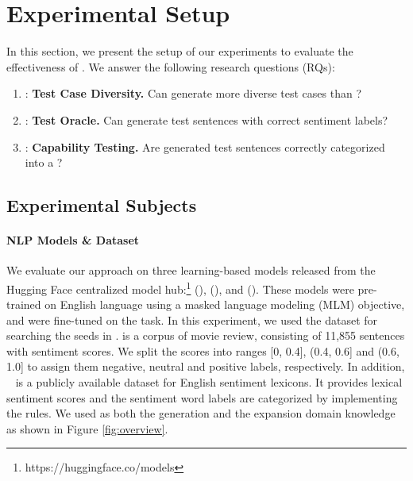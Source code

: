 \section{Experimental Setup}
\label{sec:experiment}
%
In this section, we present the setup of our experiments to evaluate
the effectiveness of \tool. We answer the following research
questions (RQs):

\begin{enumerate}[label=\textbf{RQ\arabic*}]
\item \label{rq:three}: \textbf{Test Case Diversity.} Can \tool generate more diverse test cases
  than \Cklst?
\item \label{rq:one}: \textbf{Test Oracle.}  Can \tool generate test sentences with correct sentiment labels?
\item \label{rq:two}: \textbf{Capability Testing.} Are \tool generated test sentences correctly categorized into a \lc?
\end{enumerate}


\subsection{Experimental Subjects}

\paragraph*{\textbf{NLP Models \& Dataset}}
We evaluate our approach on three learning-based \sa models released from the Hugging Face centralized
model hub:\footnote{https://huggingface.co/models} \texttt{\Bert}
(\bertsamodel), \texttt{\Roberta} (\robertasamodel), and \texttt{\Dbert} (\disbertsamodel). These models were pre-trained on English
language using a masked language modeling (MLM) objective, and
were fine-tuned on the \sa task. In this experiment, we used the \Sst \cite{socher2013sst} dataset for
searching the seeds in \tool. \Sst is a
corpus of movie review, consisting of 11,855 sentences
with sentiment scores. We split the
scores into ranges [0, 0.4], (0.4, 0.6] and (0.6, 1.0] to assign them
negative, neutral and positive labels, respectively. In addition,
\Swn~\cite{baccianella2010sentiwordnet} is a publicly available dataset for English sentiment lexicons.  
It provides lexical sentiment scores and the sentiment word labels 
are categorized by implementing the rules.
We used \Swn as both the generation and the expansion domain knowledge as shown in Figure \ref{fig:overview}.

